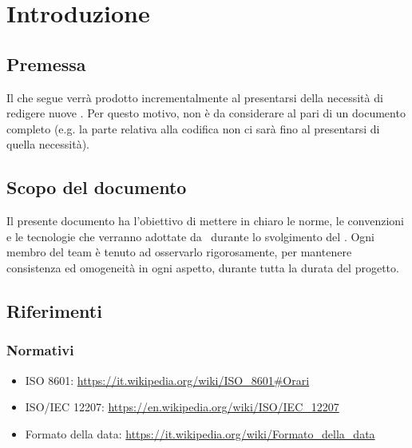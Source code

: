 \section{Introduzione}

    \subsection{Premessa}
    Il  che segue verrà prodotto incrementalmente al presentarsi della necessità di redigere nuove .
    Per questo motivo, non è da considerare al pari di un documento completo (e.g. la parte relativa alla codifica non ci sarà fino
    al presentarsi di quella necessità).

    \subsection{Scopo del documento}
    Il presente documento ha l’obiettivo di mettere in chiaro le norme, le convenzioni e le tecnologie che verranno adottate da \gruppo\ durante lo svolgimento del . Ogni membro del team \`e tenuto ad osservarlo rigorosamente, per mantenere consistenza ed omogeneit\`a in ogni aspetto, durante tutta la durata del progetto.\par

    

    

\subsection{Riferimenti}

    \subsubsection{Normativi}	\label{rifnorma}
    \begin{itemize}
    	\item ISO 8601: \url{https://it.wikipedia.org/wiki/ISO\_8601#Orari}
    	\item ISO/IEC 12207: \url{https://en.wikipedia.org/wiki/ISO/IEC_12207}
    	\item Formato della data: \url{https://it.wikipedia.org/wiki/Formato\_della\_data}
    \end{itemize}

